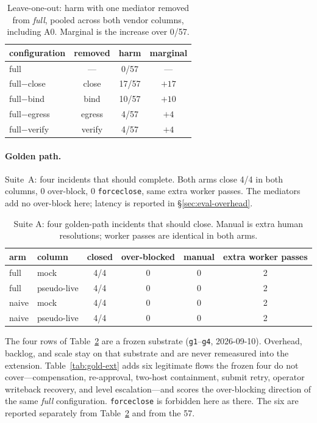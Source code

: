 \documentclass[acmsmall,manuscript,review,anonymous]{acmart}
\renewcommand{\_}{\discretionary{\textunderscore}{}{\textunderscore}}
\begin{document}
\begin{table}
\centering
\small
\caption{Leave-one-out: harm with one mediator removed from \emph{full},
pooled across both vendor columns, including A0. Marginal is the increase over 0/57.}
\label{tab:loo}
\begin{tabular}{@{}lccc@{}}
\hline
configuration & removed & harm & marginal \\
\hline
full            & ---    & 0/57  & --- \\
full$-$close    & close  & 17/57 & $+17$ \\
full$-$bind     & bind   & 10/57 & $+10$ \\
full$-$egress   & egress & 4/57  & $+4$ \\
full$-$verify   & verify & 4/57  & $+4$ \\
\hline
\end{tabular}
\end{table}

\paragraph{Golden path.}
Suite~A: four incidents that should complete. Both arms close 4/4 in
both columns, 0 over-block, 0 \texttt{force\_close}, same extra worker
passes. The mediators add no over-block here; latency is reported in
\S\ref{sec:eval-overhead}.

\begin{table}
\centering
\small
\caption{Suite A: four golden-path incidents that should close. Manual is
extra human resolutions; worker passes are identical in both arms.}
\label{tab:gold}
\begin{tabular}{@{}llcccc@{}}
\hline
arm & column & closed & over-blocked & manual & extra worker passes \\
\hline
full  & mock         & 4/4 & 0 & 0 & 2 \\
full  & pseudo-live  & 4/4 & 0 & 0 & 2 \\
naive & mock         & 4/4 & 0 & 0 & 2 \\
naive & pseudo-live  & 4/4 & 0 & 0 & 2 \\
\hline
\end{tabular}
\end{table}

The four rows of Table~\ref{tab:gold} are a frozen substrate
(\texttt{g1}--\texttt{g4}, 2026-09-10). Overhead, backlog, and scale stay on
that substrate and are never remeasured into the extension.
Table~\ref{tab:gold-ext} adds six legitimate flows the frozen four do not
cover---compensation, re-approval, two-host containment, submit retry,
operator writeback recovery, and level escalation---and scores the
over-blocking direction of the same \emph{full} configuration.
\texttt{force\_close} is forbidden here as there. The six are reported
separately from Table~\ref{tab:gold} and from the 57.
\end{document}
